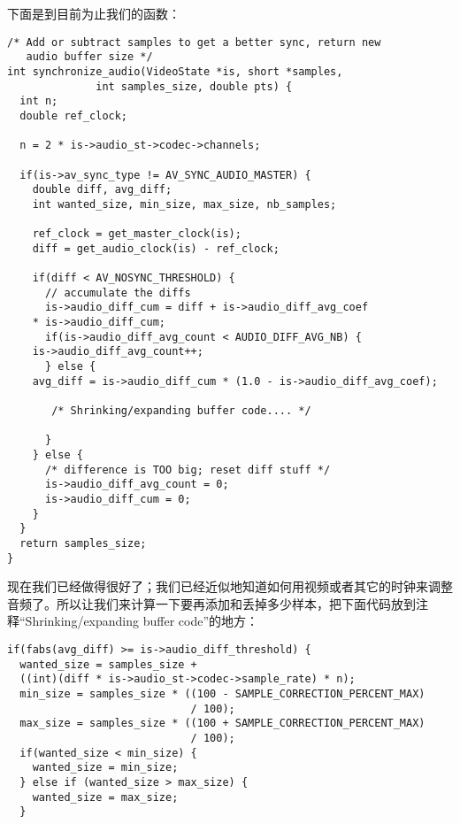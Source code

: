 
下面是到目前为止我们的函数：
\begin{lstlisting}
/* Add or subtract samples to get a better sync, return new
   audio buffer size */
int synchronize_audio(VideoState *is, short *samples,
              int samples_size, double pts) {
  int n;
  double ref_clock;

  n = 2 * is->audio_st->codec->channels;

  if(is->av_sync_type != AV_SYNC_AUDIO_MASTER) {
    double diff, avg_diff;
    int wanted_size, min_size, max_size, nb_samples;

    ref_clock = get_master_clock(is);
    diff = get_audio_clock(is) - ref_clock;

    if(diff < AV_NOSYNC_THRESHOLD) {
      // accumulate the diffs
      is->audio_diff_cum = diff + is->audio_diff_avg_coef
    * is->audio_diff_cum;
      if(is->audio_diff_avg_count < AUDIO_DIFF_AVG_NB) {
    is->audio_diff_avg_count++;
      } else {
    avg_diff = is->audio_diff_cum * (1.0 - is->audio_diff_avg_coef);

       /* Shrinking/expanding buffer code.... */

      }
    } else {
      /* difference is TOO big; reset diff stuff */
      is->audio_diff_avg_count = 0;
      is->audio_diff_cum = 0;
    }
  }
  return samples_size;
}
\end{lstlisting}

现在我们已经做得很好了；我们已经近似地知道如何用视频或者其它的时钟来调整音频了。所以让我们来计算一下要再添加和丢掉多少样本，把下面代码放到注释“Shrinking/expanding buffer code”的地方：

\begin{lstlisting}
if(fabs(avg_diff) >= is->audio_diff_threshold) {
  wanted_size = samples_size +
  ((int)(diff * is->audio_st->codec->sample_rate) * n);
  min_size = samples_size * ((100 - SAMPLE_CORRECTION_PERCENT_MAX)
                             / 100);
  max_size = samples_size * ((100 + SAMPLE_CORRECTION_PERCENT_MAX)
                             / 100);
  if(wanted_size < min_size) {
    wanted_size = min_size;
  } else if (wanted_size > max_size) {
    wanted_size = max_size;
  }
\end{lstlisting}

